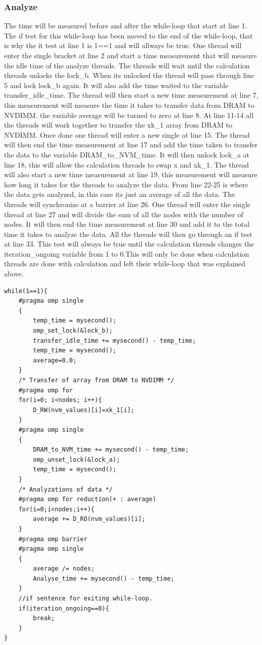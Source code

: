 \documentclass[12pt,a4paper,USenglish]{article}      %
\begin{document}
\subsubsection{Analyze}
The time will be measured before and after the while-loop that start at line 1. The if test for this while-loop has been moved to the end of the while-loop, that is why the it test at line 1 is 1==1 and will allways be true. 
One thread will enter the single bracket at line 2 and start a time measurement that will measure the idle time of the analyze threads. The threads will wait until the calculation threads unlocks the lock\_b. When its unlocked the thread will pass through line 5 and lock lock\_b again. It will also add the time waited to the variable transfer\_idle\_time. The thread will then start a new time measurement at line 7, this measurement will measure the time it takes to transfer data from DRAM to NVDIMM. the variable average will be turned to zero at line 8.
At line 11-14 all the threads will work together to transfer the xk\_1 array from DRAM to NVDIMM.
Once done one thread will enter a new single at line 15. The thread will then end the time measurement at line 17 and add the time taken to transfer the data to the variable DRAM\_to\_NVM\_time.
It will then unlock lock\_a at line 18, this will allow the calculation threads to swap x and xk\_1. The thread will also start a new time measurement at line 19, this measurement will measure how long it takes for the threads to analyze the data. From line 22-25 is where the data gets analyzed, in this case its just an average of all the data. 
The threads will synchronize at a barrier at line 26. One thread will enter the single thread at line 27 and will divide the sum of all the nodes with the number of nodes.
It will then end the time measurement at line 30 and add it to the total time it takes to analyze the data.
All the threads will then go through an if test at line 33. This test will always be true until the calculation threads changes the iteration\_ongoing variable from 1 to 0.This will only be done when calculation threads are done with calculation and left their while-loop that was explained above.

\begin{lstlisting}[caption=Analyze]
while(1==1){
	#pragma omp single
	{
		temp_time = mysecond();
		omp_set_lock(&lock_b);
		transfer_idle_time += mysecond() - temp_time;
		temp_time = mysecond();
		average=0.0;
	}
	/* Transfer of array from DRAM to NVDIMM */
	#pragma omp for
	for(i=0; i<nodes; i++){ 
		D_RW(nvm_values)[i]=xk_1[i];
	}
	#pragma omp single 
	{
		DRAM_to_NVM_time += mysecond() - temp_time;
		omp_unset_lock(&lock_a);
		temp_time = mysecond();
	}
	/* Analyzations of data */
	#pragma omp for reduction(+ : average)
	for(i=0;i<nodes;i++){
		average += D_RO(nvm_values)[i];
	}
	#pragma omp barrier
	#pragma omp single
	{
		average /= nodes;
		Analyse_time += mysecond() - temp_time;
	}
	//if sentence for exiting while-loop.
	if(iteration_ongoing==0){
		break;
	}
}
\end{lstlisting}
\end{document}
